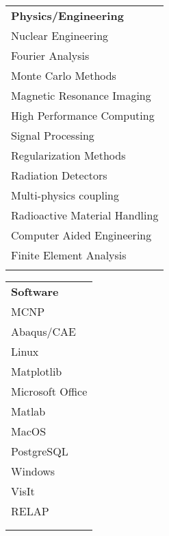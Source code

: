 \\[2mm]
\begin{minipage}{0.32\textwidth}
\begin{tabular}{l}
	{\large\textbf{Physics/Engineering}} \\
	\highskillbw Nuclear Engineering \\
	\highskillbw Fourier Analysis \\ 
	\highskillbw Monte Carlo Methods \\
	\highskillbw Magnetic Resonance Imaging \\ 
	\medskillbw High Performance Computing \\
	\medskillbw Signal Processing \\
	\medskillbw Regularization Methods  \\
	\medskillbw Radiation Detectors \\
	\medskillbw Multi-physics coupling \\
	\medskillbw Radioactive Material Handling \\
	\lowskillbw Computer Aided Engineering \\
	\lowskillbw Finite Element Analysis \\
	\\
\end{tabular}
\end{minipage}%
\begin{minipage}{0.2\textwidth}
	\begin{center}
\begin{tabular}{l}
	{\large\textbf{Software}} \\
	\highskillbw \textsc{MCNP} \\
	\highskillbw Abaqus/CAE \\
	\highskillbw Linux \\ 
	\highskillbw Matplotlib \\ 
	\highskillbw Microsoft Office \\
	\highskillbw Matlab \\
	\highskillbw MacOS \\
	\medskillbw PostgreSQL \\
	\medskillbw Windows \\
	\lowskillbw VisIt \\
	\lowskillbw RELAP \\
	\\
	\\
\end{tabular}
	\end{center}
\end{minipage}%
